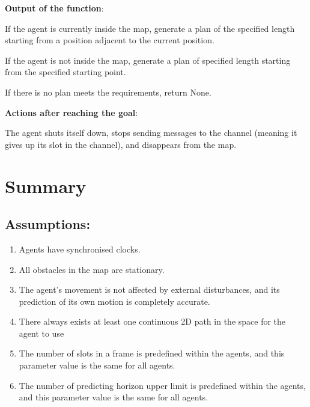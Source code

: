 \begin{algorithm}[H]
{        
    }
\end{algorithm}

\textbf{Output of the function}:

If the agent is currently inside the map, generate a plan of the specified length starting from a position adjacent to the current position.

If the agent is not inside the map, generate a plan of specified length starting from the specified starting point.

If there is no plan meets the requirements, return None.

\textbf{Actions after reaching the goal}:

The agent shuts itself down, stops sending messages to the channel (meaning it gives up its slot in the channel), and disappears from the map.

\section{Summary}

\subsection{Assumptions:}
\begin{enumerate}
    \item Agents have synchronised clocks.
    \item All obstacles in the map are stationary.
    \item The agent’s movement is not affected by external disturbances, and
    its prediction of its own motion is completely accurate.
    \item There always exists at least one continuous 2D path in the space
    for the agent to use
    \item  The number of slots in a frame is predefined within the agents, and
    this parameter value is the same for all agents.
    \item The number of predicting horizon upper limit is predefined within the
    agents, and this parameter value is the same for all agents.
\end{enumerate}

